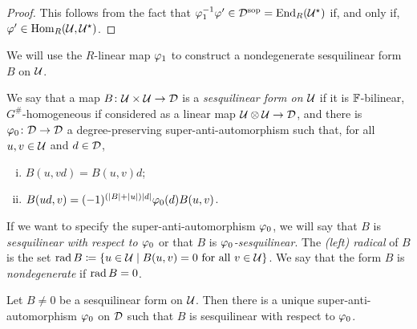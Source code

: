 \begin{proof}
	This follows from the fact that $ \varphi_1^{-1} \varphi' \in  \mathcal{D}^{\mathrm{sop}} = \operatorname{End}_R(\mathcal U^\star)$ if, and only if, $\varphi' \in \operatorname{Hom}_R(\mathcal U, \mathcal U^\star)$.
\end{proof}


We will use
the $R$-linear map
$\varphi_1$ to construct a nondegenerate sesquilinear form $B$ on $\mathcal U$.

\begin{defi}\label{def:sesquilinear-form}
	We say that a map $B\colon \mathcal U \times \mathcal U \to \mathcal{D}$ is a \emph{sesquilinear form on $\mathcal U$} if it is $\mathbb{F}$-bilinear, $G^\#$-homogeneous if considered as a linear map $\mathcal U\otimes \mathcal U \to \mathcal{D}$, and there is $\varphi_0\colon \mathcal{D} \to \mathcal{D}$ a degree-preserving su\-per\--an\-ti\--auto\-mor\-phism such that, for all $u,v \in \mathcal U$ and $d\in \mathcal{D}$,
	\begin{enumerate}[(i)]
		\item $B(u,vd) = B(u,v)d$; \label{enum:linear-on-the-second}
		\item $B(ud, v) = (-1)^ {(|B| + |u|)|d|}\varphi_0(d) B(u, v)$. \label{enum:vphi0-linear-on-the-first}
	\end{enumerate}
	If we want to specify the super-anti-automorphism $\varphi_0$, we will say that $B$ is \emph{sesquilinear with respect to $\varphi_0$} or that $B$ is \emph{$\varphi_0$-sesquilinear}.
	The \emph{(left) radical} of $B$ is the set $\operatorname{rad} B \coloneqq \{u\in \mathcal U \mid B(u, v) = 0 \text{ for all } v\in \mathcal U\}$. 
	We say that the form $B$ is \emph{nondegenerate} if $\operatorname{rad} B = 0$.
\end{defi}


\begin{lemma}\label{lemma:B-determines-vphi_0}
	Let $B \neq 0$ be a sesquilinear form on $\mathcal U$.
	Then there is a unique super-anti-automorphism $\varphi_0$ on $\mathcal{D}$ such that $B$ is sesquilinear with respect to $\varphi_0$.
\end{lemma}

